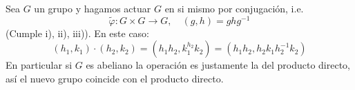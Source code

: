 \begin{eje}
	Sea $G$ un grupo y hagamos actuar $G$ en si mismo por conjugación, i.e.
	\begin{equation*}
		\tilde{\varphi}: G \times G \to G, \quad (g, h) = ghg^{-1}
	\end{equation*}
	(Cumple i), ii), iii)).
	En este caso:
	\begin{equation*}
		(h_1, k_1) \cdot (h_2, k_2) = (h_1 h_2, k_1^{h_2} k_2) = (h_1 h_2, h_2 k_1 h_2^{-1} k_2)
	\end{equation*}
	En particular si $G$ es abeliano la operación es justamente la del producto directo, así el nuevo grupo coincide con el producto directo.
\end{eje}


